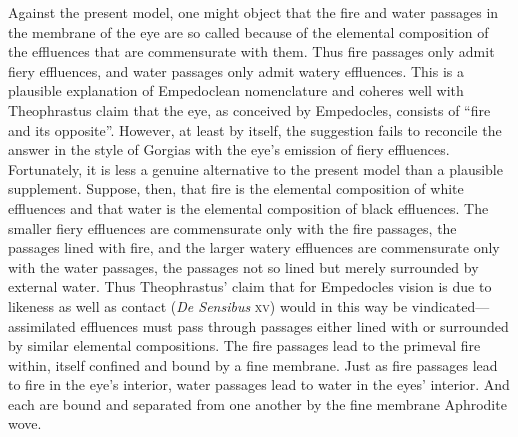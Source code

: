 Against the present model, one might object that the fire and water passages in the membrane of the eye are so called because of the elemental composition of the effluences that are commensurate with them. Thus fire passages only admit fiery effluences, and water passages only admit watery effluences. This is a plausible explanation of Empedoclean nomenclature and coheres well with Theophrastus claim that the eye, as conceived by Empedocles, consists of ``fire and its opposite''. However, at least by itself, the suggestion fails to reconcile the answer in the style of Gorgias with the eye's emission of fiery effluences. Fortunately, it is less a genuine alternative to the present model than a plausible supplement. Suppose, then, that fire is the elemental composition of white effluences and that water is the elemental composition of black effluences. The smaller fiery effluences are commensurate only with the fire passages, the passages lined with fire, and the larger watery effluences are commensurate only with the water passages, the passages not so lined but merely surrounded by external water. Thus Theophrastus' claim that for Empedocles vision is due to likeness as well as contact (\emph{De Sensibus} \textsc{xv}) would in this way be vindicated---assimilated effluences must pass through passages either lined with or surrounded by similar elemental compositions. The fire passages lead to the primeval fire within, itself confined and bound by a fine membrane. Just as fire passages lead to fire in the eye's interior, water passages lead to water in the eyes' interior. And each are bound and separated from one another by the fine membrane Aphrodite wove.

